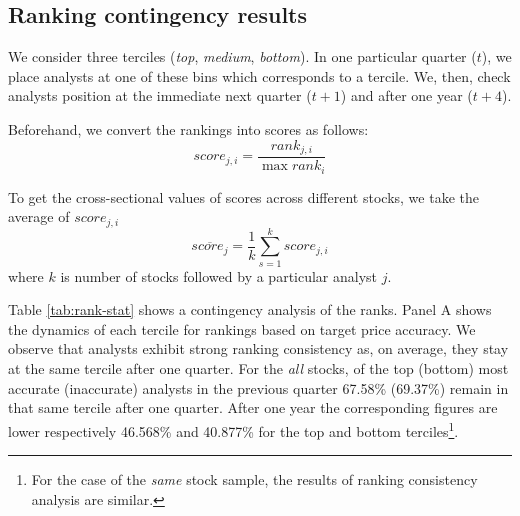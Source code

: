 \documentclass{article}\usepackage[]{graphicx}\usepackage[]{color}
\newcommand{\same}{\textit{same}}
\newcommand{\all}{\textit{all}}
\begin{document}
\subsection{Ranking contingency results}
We consider  three terciles (\textit{top}, \textit{medium}, \textit{bottom}). In one particular quarter ($t$), we place  analysts at one of these bins which corresponds to a tercile. We, then,  check analysts position at the immediate next quarter ($t+1$) and after one year ($t+4$).   

Beforehand, we convert the rankings into scores as follows:
\begin{equation}
\label{eq:score}
score_{j,i}=\frac{rank_{j,i}}{\max{rank_i}}
\end{equation}

To get the cross-sectional values of scores across different stocks, we take the average of $score_{j,i}$
\begin{equation}
\label{eq:mean-score}
\overline{score_{j}}= \frac{1}{k} \sum_{s=1}^{k} score_{j,i}
\end{equation}
where $k$ is number of stocks followed by a particular analyst $j$. 

Table \ref{tab:rank-stat} shows a contingency analysis of the ranks. 
Panel A shows the dynamics of each tercile for rankings based on target price  accuracy. We observe that analysts exhibit strong ranking consistency as, on average, they stay at the same tercile after one quarter. For the \all{} stocks,  of the top (bottom) most accurate (inaccurate) analysts in the previous quarter 67.58\% (69.37\%) remain in that same tercile after one quarter. After one year the corresponding figures are lower respectively 46.568\% and 40.877\% for the top and bottom terciles\footnote{For the case of the \same{} stock sample, the results of ranking consistency analysis are similar.}.
\end{document}
